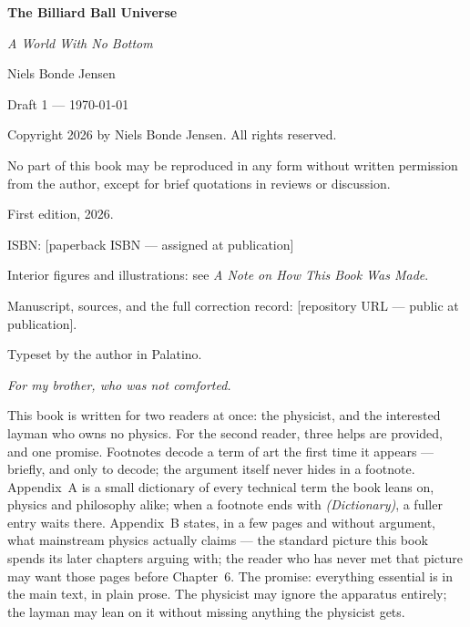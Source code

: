 \documentclass[fontsize=11pt,paper=a4,pagesize=auto,parskip=half-]{scrbook}
\begin{document}
\frontmatter
\begin{titlepage}
\centering
\vspace*{1.6in}
{\Huge\bfseries The Billiard Ball Universe\par}
\vspace{0.35in}
{\Large\itshape A World With No Bottom\par}
\vspace{1.2in}
{\large Niels Bonde Jensen\par}
\vfill
{\small Draft 1 --- \today\par}
\vspace*{0.5in}
\end{titlepage}
\thispagestyle{empty}
\null\vfill
{\small\noindent
Copyright \textcopyright{} 2026 by Niels Bonde Jensen. All rights reserved.

\noindent No part of this book may be reproduced in any form without written
permission from the author, except for brief quotations in reviews or discussion.

\noindent First edition, 2026.

\noindent ISBN: [paperback ISBN --- assigned at publication]

\noindent Interior figures and illustrations: see \emph{A Note on How This Book Was Made}.

\noindent Manuscript, sources, and the full correction record:
[repository URL --- public at publication].

\noindent Typeset by the author in Palatino.
\par}
\cleardoublepage
\thispagestyle{empty}
\null\vspace*{0.28\textheight}
\begin{center}
{\large\itshape For my brother, who was not comforted.}
\end{center}
\vfill
\cleardoublepage
\tableofcontents

This book is written for two readers at once: the physicist, and the interested layman who owns no physics. For the second reader, three helps are provided, and one promise. Footnotes decode a term of art the first time it appears --- briefly, and only to decode; the argument itself never hides in a footnote. Appendix~A is a small dictionary of every technical term the book leans on, physics and philosophy alike; when a footnote ends with \emph{(Dictionary)}, a fuller entry waits there. Appendix~B states, in a few pages and without argument, what mainstream physics actually claims --- the standard picture this book spends its later chapters arguing with; the reader who has never met that picture may want those pages before Chapter~6. The promise: everything essential is in the main text, in plain prose. The physicist may ignore the apparatus entirely; the layman may lean on it without missing anything the physicist gets.
\end{document}
